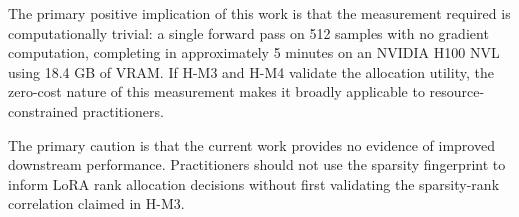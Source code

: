 The primary positive implication of this work is that the measurement required is computationally trivial: a single forward pass on 512 samples with no gradient computation, completing in approximately 5 minutes on an NVIDIA H100 NVL using 18.4 GB of VRAM. If H-M3 and H-M4 validate the allocation utility, the zero-cost nature of this measurement makes it broadly applicable to resource-constrained practitioners.

The primary caution is that the current work provides no evidence of improved downstream performance. Practitioners should not use the sparsity fingerprint to inform LoRA rank allocation decisions without first validating the sparsity-rank correlation claimed in H-M3.

